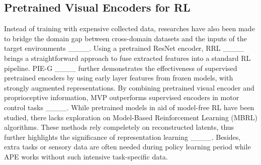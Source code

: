 \subsection{Pretrained Visual Encoders for RL}

Instead of training with expensive collected data, researches have also been made to bridge the domain gap between cross-domain datasets and the inputs of the target environments ____. Using a pretrained ResNet encoder, RRL ____ brings a straightforward approach to fuse extracted features into a standard RL pipeline. PIE-G ____ further demonstrates the effectiveness of supervised pretrained encoders by using early layer features from frozen models, with strongly augmented representations. By combining pretrained visual encoder and proprioceptive information, MVP outperforms supervised encoders in motor control tasks ____. While pretrained models in aid of model-free RL have been studied, there lacks exploration on Model-Based Reinforcement Learning (MBRL) algorithms. These methods rely compeletely on reconstructed latents, thus further highlights the significance of representation learning ____.
Besides, extra tasks or sensory data are often needed during policy learning period while APE works without such intensive task-specific data.